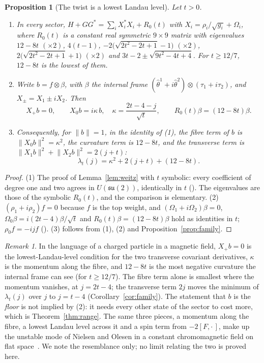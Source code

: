 \documentclass[11pt]{article}
\newtheorem{proposition}[theorem]{Proposition}
\theoremstyle{definition}
\theoremstyle{remark}
\newtheorem{remark}[theorem]{Remark}
\newif\ifredline
\newcommand{\redins}[1]{\ifredline{\color{blue}#1}\else#1\fi}
\newcommand{\su}{\mathfrak{su}(2)}
\newcommand{\norm}[1]{\lVert #1\rVert}
\begin{document}
\begin{proposition}[The twist is a lowest Landau level]\label{prop:landau}
Let $t>0$.
\begin{enumerate}
  \item In every sector, $H+GG^*=\sum_iX_i^*X_i+R_0(t)$ with $X_i=\rho_i/\sqrt{g_i}+\Omega_i$, where $R_0(t)$ is a
    constant real symmetric $9\times9$ matrix with eigenvalues $12-8t$ $(\times2)$, $4(t-1)$,
    $-2\bigl(\sqrt{2t^2-2t+1}-1\bigr)$ $(\times2)$, $2\bigl(\sqrt{2t^2-2t+1}+1\bigr)$ $(\times2)$ and
    $3t-2\pm\sqrt{9t^2-4t+4}$. For $t\ge12/7$, $12-8t$ is the lowest of them.
  \item Write $b=f\otimes\beta$, with $\beta$ the internal frame $(\hat\theta^1+i\hat\theta^2)\otimes(\tau_1+i\tau_2)$,
    and $X_\pm=X_1\pm iX_2$. Then
    \[
      X_+b=0,\qquad X_0b=i\kappa\,b,\quad \kappa=\frac{2t-4-j}{\sqrt t},\qquad R_0(t)\beta=(12-8t)\beta .
    \]
  \item Consequently, for $\norm b=1$, in the identity of (1), the fibre term of $b$ is $\norm{X_0b}^2=\kappa^2$, the curvature term
    is $12-8t$, and the transverse term is $\norm{X_1b}^2+\norm{X_2b}^2=2(j+t)$:
    \[
      \lambda_t(j)=\kappa^2+2(j+t)+(12-8t).
    \]
\end{enumerate}
\end{proposition}
\begin{proof}
(1) The proof of Lemma~\ref{lem:weitz} with $t$ symbolic: every coefficient of degree one and two agrees in
$U(\su)$, identically in $t$ (). The eigenvalues are those of
the symbolic $R_0(t)$, and the comparison is elementary. (2) $(\rho_1+i\rho_2)f=0$ because $f$ is the top weight,
and $(\Omega_1+i\Omega_2)\beta=0$, $\Omega_0\beta=i(2t-4)\beta/\sqrt t$ and $R_0(t)\beta=(12-8t)\beta$ hold as
identities in $t$; $\rho_0f=-ij f$ (). (3) follows from (1), (2) and
Proposition~\ref{prop:family}.
\end{proof}

\begin{remark}
In the language of a charged particle in a magnetic field, $X_+b=0$ is the lowest-Landau-level condition for the
two transverse covariant derivatives, $\kappa$ is the momentum along the fibre, and $12-8t$ is the most negative
curvature the internal frame can see (for $t\ge12/7$). The fibre term alone is smallest where the momentum
vanishes, at $j=2t-4$; the transverse term $2j$ moves the minimum of $\lambda_t(j)$ over $j$ to $j=t-4$
(Corollary~\ref{cor:family}). The statement that
$b$ is the \emph{floor} is not implied by (2): it needs every other state of the sector to cost more, which is
Theorem~\ref{thm:range}.\redins{ The same three pieces, a momentum along the fibre, a lowest Landau level across
it and a spin term from $-2[F,\cdot\,]$, make up the unstable mode of Nielsen and Olesen in a constant chromomagnetic
field on flat space~\cite{nielsenolesen1978}. We note the resemblance only; no limit relating the two is proved
here.}
\end{remark}
\end{document}

